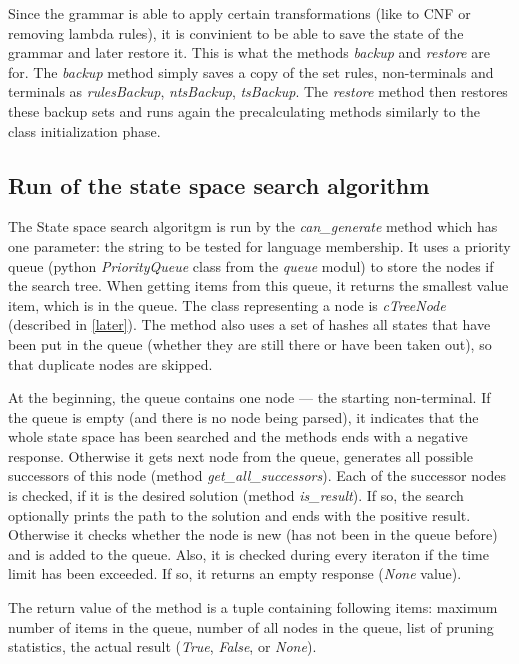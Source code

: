 Since the grammar is able to apply certain transformations (like to CNF or removing lambda rules), it is convinient to be able to save the state of the grammar and later restore it. This is what the methods \textit{backup} and \textit{restore} are for. The \textit{backup} method simply saves a copy of the set rules, non-terminals and terminals as \textit{rulesBackup}, \textit{ntsBackup}, \textit{tsBackup}. The \textit{restore} method then restores these backup sets and runs again the precalculating methods similarly to the class initialization phase.

\subsection{Run of the state space search algorithm}
The State space search algoritgm is run by the \textit{can\_generate} method which has one parameter: the string to be tested for language membership. It uses a priority queue (python \textit{PriorityQueue} class from the \textit{queue} modul) to store the nodes if the search tree. When getting items from this queue, it returns the smallest value item, which is in the queue. The class representing a node is \textit{cTreeNode} (described in \ref{later}). The method also uses a set of hashes all states that have been put in the queue (whether they are still there or have been taken out), so that duplicate nodes are skipped.

At the beginning, the queue contains one node --- the starting non-terminal. If the queue is empty (and there is no node being parsed), it indicates that the whole state space has been searched and the methods ends with a negative response. Otherwise it gets next node from the queue, generates all possible successors of this node (method \textit{get\_all\_successors}). Each of the successor nodes is checked, if it is the desired solution (method \textit{is\_result}). If so, the search optionally prints the path to the solution and ends with the positive result. Otherwise it checks whether the node is new (has not been in the queue before) and is added to the queue. Also, it is checked during every iteraton if the time limit has been exceeded. If so, it returns an empty response (\textit{None} value).

The return value of the method is a tuple containing following items: maximum number of items in the queue, number of all nodes in the queue, list of pruning statistics, the actual result (\textit{True}, \textit{False}, or \textit{None}).

